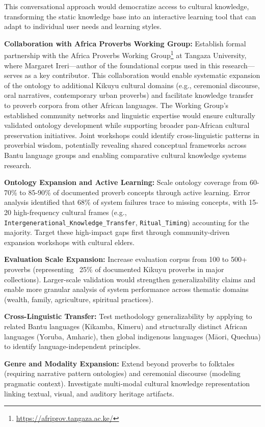 This conversational approach would democratize access to cultural knowledge, transforming the static knowledge base into an interactive learning tool that can adapt to individual user needs and learning styles.

\textbf{Collaboration with Africa Proverbs Working Group:} Establish formal partnership with the Africa Proverbs Working Group\footnote{\url{https://afriprov.tangaza.ac.ke/}} at Tangaza University, where Margaret Ireri—author of the foundational corpus used in this research—serves as a key contributor. This collaboration would enable systematic expansion of the ontology to additional Kikuyu cultural domains (e.g., ceremonial discourse, oral narratives, contemporary urban proverbs) and facilitate knowledge transfer to proverb corpora from other African languages. The Working Group's established community networks and linguistic expertise would ensure culturally validated ontology development while supporting broader pan-African cultural preservation initiatives. Joint workshops could identify cross-linguistic patterns in proverbial wisdom, potentially revealing shared conceptual frameworks across Bantu language groups and enabling comparative cultural knowledge systems research.

\textbf{Ontology Expansion and Active Learning:} Scale ontology coverage from 60-70\% to 85-90\% of documented proverb concepts through active learning. Error analysis identified that 68\% of system failures trace to missing concepts, with 15-20 high-frequency cultural frames (e.g., \texttt{Intergenerational\_Knowledge\_Transfer}, \texttt{Ritual\_Timing}) accounting for the majority. Target these high-impact gaps first through community-driven expansion workshops with cultural elders.

\textbf{Evaluation Scale Expansion:} Increase evaluation corpus from 100 to 500+ proverbs (representing ~25\% of documented Kikuyu proverbs in major collections). Larger-scale validation would strengthen generalizability claims and enable more granular analysis of system performance across thematic domains (wealth, family, agriculture, spiritual practices).

\textbf{Cross-Linguistic Transfer:} Test methodology generalizability by applying to related Bantu languages (Kikamba, Kimeru) and structurally distinct African languages (Yoruba, Amharic), then global indigenous languages (Māori, Quechua) to identify language-independent principles.

\textbf{Genre and Modality Expansion:} Extend beyond proverbs to folktales (requiring narrative pattern ontologies) and ceremonial discourse (modeling pragmatic context). Investigate multi-modal cultural knowledge representation linking textual, visual, and auditory heritage artifacts.

